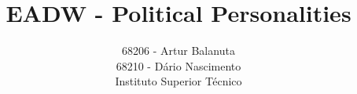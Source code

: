 \documentclass[times, 12pt,twocolumn]{article}
\begin{document}
\title{EADW - Political Personalities}

\author{68206 - Artur Balanuta \\ 68210 - Dário Nascimento \\ Instituto Superior Técnico }
\maketitle
\thispagestyle{empty}













\nocite{ex1, Ghemawat2003}


\end{document}

